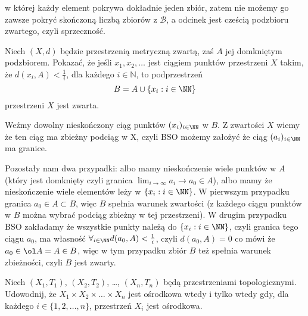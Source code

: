 \documentclass[11pt]{scrartcl}
\begin{document}
   w której każdy element pokrywa dokładnie jeden zbiór, zatem nie możemy go zawsze pokryć skończoną liczbą zbiorów z $\mathcal{B}$, a odcinek jest cześcią podzbioru zwartego, czyli sprzeczność. 
   
   \newpage
   
   \begin{zadanie*}
       Niech $(X, d)$ będzie przestrzenią metryczną zwartą, zaś $A$ jej domkniętym podzbiorem. Pokazać, że jeśli $x_1, x_2, \dots$ jest ciągiem punktów przestrzeni $X$ takim, że $d(x_i, A) < \frac{1}{i}$, dla każdego $i \in \mathbb{N}$, to podprzestrzeń
        \[
          B = A \cup \{x_i : i \in \NN \}
        \]
      przestrzeni $X$ jest zwarta.
   \end{zadanie*}

   Weźmy dowolny nieskończony ciąg punktów $(x_i)_{i \in \NN}$ w $B$. Z zwartości $X$ wiemy że ten ciąg ma zbieżny podciąg w X, czyli BSO możemy założyć że ciąg $(a_i)_{i \in \NN}$ ma granice.

   Pozostały nam dwa przypadki: albo mamy nieskończenie wiele punktów w $A$ (który jest domknięty czyli granica $\lim_{i \to \infty } a_i \to a_0 \in A $), albo mamy że nieskończenie wiele elementów leży w $\left \{ x_i : i \in \NN \right \}$.
   W pierwszym przypadku granica $a_0 \in A \subset B$, więc $B$ spełnia warunek zwartości (z każdego ciągu punktów w $B$ można wybrać podciąg zbieżny w tej przestrzeni).
   W drugim przypadku BSO zakładamy że wszystkie punkty należą do $\left \{ x_i : i \in \NN \right \}$, czyli granica tego ciągu $a_0$, ma własność $\forall_{i \in \NN} d(a_0, A) < \frac{1}{i}$, czyli $d(a_0, A) = 0$ co mówi że $a_0 \in \ol A = A \in B$, więc w tym przypadku zbiór $B$ też spełnia warunek zbieżności, czyli $B$ jest zwarty.

   \begin{zadanie*}
       Niech $(X_1, T_1)$, $(X_2, T_2)$, \dots, $(X_n, T_n)$ będą przestrzeniami topologicznymi. Udowodnij, że $X_1 \times X_2 \times \dots \times X_n$ jest ośrodkowa wtedy i tylko wtedy gdy, dla każdego $i \in \{1, 2, \dots, n\}$, przestrzeń $X_i$ jest ośrodkowa.
   \end{zadanie*}
\end{document}
